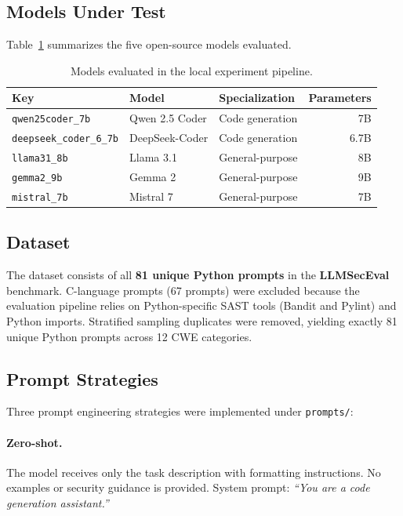 \documentclass[12pt,a4paper]{article}
\begin{document}
\subsection{Models Under Test}
Table~\ref{tab:models} summarizes the five open-source models evaluated.

\begin{table}[H]
\centering
\caption{Models evaluated in the local experiment pipeline.}
\label{tab:models}
\begin{tabular}{lllr}
\toprule
\textbf{Key} & \textbf{Model} & \textbf{Specialization} & \textbf{Parameters} \\
\midrule
\texttt{qwen25coder\_7b}      & Qwen 2.5 Coder  & Code generation & 7B \\
\texttt{deepseek\_coder\_6\_7b} & DeepSeek-Coder  & Code generation & 6.7B \\
\texttt{llama31\_8b}           & Llama 3.1       & General-purpose  & 8B \\
\texttt{gemma2\_9b}            & Gemma 2         & General-purpose  & 9B \\
\texttt{mistral\_7b}           & Mistral 7       & General-purpose  & 7B \\
\bottomrule
\end{tabular}
\end{table}

\subsection{Dataset}
The dataset consists of all \textbf{81 unique Python prompts} in the \textbf{LLMSecEval} benchmark. C-language prompts (67 prompts) were excluded because the evaluation pipeline relies on Python-specific SAST tools (Bandit and Pylint) and Python imports. Stratified sampling duplicates were removed, yielding exactly 81 unique Python prompts across 12 CWE categories.

\subsection{Prompt Strategies}
\label{sec:strategies}
Three prompt engineering strategies were implemented under \texttt{prompts/}:

\paragraph{Zero-shot.} The model receives only the task description with formatting instructions. No examples or security guidance is provided. System prompt: \textit{``You are a code generation assistant.''}
\end{document}
